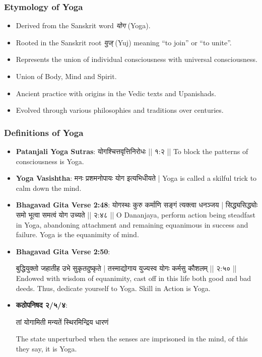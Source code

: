 \begin{frame}[fragile]\frametitle{Etymology of Yoga}

      \begin{itemize}
	
		\item Derived from the Sanskrit word \textit{योग} (Yoga).
		\item Rooted in the Sanskrit root \textit{युज्} (Yuj) meaning “to join” or “to unite”.
		\item Represents the union of individual consciousness with universal consciousness.
		\item Union of Body, Mind and Spirit.
		\item Ancient practice with origins in the Vedic texts and Upanishads.
		\item Evolved through various philosophies and traditions over centuries.
	  \end{itemize}

\end{frame}

\begin{frame}[fragile]\frametitle{Definitions of Yoga}
      \begin{itemize}
        \item \textbf{Patanjali Yoga Sutras}:      योगश्चित्तवृत्तिनिरोधः || १:२ || 
          To block the patterns of consciousness is Yoga.

        \item \textbf{Yoga Vasishtha}:          मनः प्रशमनोपायः योग इत्यभिधीयते |
          Yoga is called a skilful trick to calm down the mind.
        \item \textbf{Bhagavad Gita Verse 2:48}:         योगस्थः कुरु कर्माणि सङ्गं त्यक्त्वा धनञ्जय |
          सिद्ध्यसिद्ध्योः समो भूत्वा समत्वं योग उच्यते || २:४८ ||
          O Dananjaya, perform action being steadfast in Yoga, abandoning attachment and remaining equanimous in success and failure. Yoga is the equanimity of mind.

        \item \textbf{Bhagavad Gita Verse 2:50}:
          
          बुद्धियुक्तो जहातीह उभे सुकृतदुष्कृते |
          तस्माद्योगाय युज्यस्व योगः कर्मसु कौशलम् || २:५० ||
          Endowed with wisdom of equanimity, cast off in this life both good and bad deeds. Thus, dedicate yourself to Yoga. Skill in Action is Yoga.
          
\item \textbf{कठोपनिषद २/५/४}:

तां योगामिती मन्यतें स्थिरमिन्द्रिय धारणं

The state unperturbed when the senses are imprisoned in the mind, of this they say, it is Yoga.

      \end{itemize}
\end{frame}

